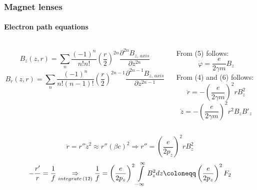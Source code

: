 \begin{frame}
  \frametitle{Magnet lenses}
  \framesubtitle{Electron path equations}
  \rfn
  \begin{scriptsize}
  \begin{columns}
    \begin{column}{0.6\textwidth}
      \begin{equation}
        B_{z}\left(z,r\right)=\underset{n}{\sum}\frac{\left(-1\right)^{n}}{n!n!}\left(\frac{r}{2}\right)^{2n}\frac{\partial^{2n}B_{z,\,axis}}{\partial z^{2n}}
      \end{equation}
      \begin{equation}
        B_{r}\left(z,r\right)=\underset{n}{\sum}\frac{\left(-1\right)^{n}}{n!\left(n-1\right)!}\left(\frac{r}{2}\right)^{2n-1}\frac{\partial^{2n-1}B_{z,\,axis}}{\partial z^{2n-1}}
      \end{equation}
    \end{column}
    \begin{column}{0.5\textwidth}
      \bull From (5) follows:
      \begin{equation}
        \dot{\varphi}=\frac{e}{2\gamma m}B_{z}
      \end{equation}
      \bull From (4) and (6) follows:
      \begin{equation}
        \ddot{r}=-\left(\frac{e}{2\gamma m}\right)^{2}rB_{z}^{2}
      \end{equation}
      \begin{equation}
        \ddot{z}=-\left(\frac{e}{2\gamma m}\right)^{2}r^{2}B_{z}B'_{z}
      \end{equation}
    \end{column}
  \end{columns}
  \begin{equation}
    \ddot{r}=r''\dot{z}^{2}\approx r''\left(\beta c\right)^{2}\Rightarrow r''=\left(\frac{e}{2p_{z}}\right)^{2}rB_{z}^{2}
  \end{equation}
  \begin{equation}
    -\frac{r'}{r}=\frac{1}{f}\underset{integrate\,(12)}{\Rightarrow}\frac{1}{f}=\left(\frac{e}{2p_{z}}\right)^{2}\intop_{-\infty}^{\infty}B_{z}^{2}dz\coloneqq\left(\frac{e}{2p_{z}}\right)^{2}F_{2}
  \end{equation}
  \end{scriptsize}
\end{frame}

